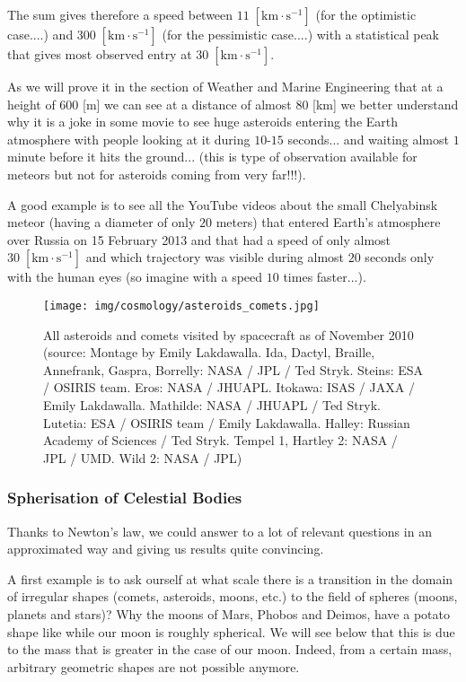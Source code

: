 	The sum gives therefore a speed between ${11 \;[\text{km}\cdot \text{s}^{-1}]}$ (for the optimistic case....) and ${300  \;[\text{km}\cdot \text{s}^{-1}]}$ (for the pessimistic case....) with a statistical peak that gives most observed entry at ${30 \;[\text{km}\cdot \text{s}^{-1}]}$.

	As we  will prove it in the section of Weather and Marine Engineering that at a height of $600$ [m] we can see at a distance of almost $80$ [km] we better understand why it is a joke in some movie to see huge asteroids entering the Earth atmosphere with people looking at it during $10$-$15$ seconds... and waiting almost $1$ minute before it hits the ground... (this is type of observation available for meteors but not for asteroids coming from very far!!!).

	A good example is to see all the YouTube videos about the small Chelyabinsk meteor (having a diameter of only $20$ meters) that entered Earth's atmosphere over Russia on 15 February 2013 and that had a speed of only almost  $30 \;[\text{km}\cdot \text{s}^{-1}]$ and which trajectory was visible during almost $20$ seconds only with the human eyes (so imagine with a speed $10$ times faster...).
	\begin{figure}[H]
		\centering
		\texttt{[image: img/cosmology/asteroids\_comets.jpg]}	
		\caption[All asteroids and comets visited by spacecraft as of November 2010]{All asteroids and comets visited by spacecraft as of November 2010 (source: Montage by Emily Lakdawalla. Ida, Dactyl, Braille, Annefrank, Gaspra, Borrelly: NASA / JPL / Ted Stryk. Steins: ESA / OSIRIS team. Eros: NASA / JHUAPL. Itokawa: ISAS / JAXA / Emily Lakdawalla. Mathilde: NASA / JHUAPL / Ted Stryk. Lutetia: ESA / OSIRIS team / Emily Lakdawalla. Halley: Russian Academy of Sciences / Ted Stryk. Tempel 1, Hartley 2: NASA / JPL / UMD. Wild 2: NASA / JPL)}
	\end{figure}
	
	\subsubsection{Spherisation of Celestial Bodies}
	Thanks to Newton's law, we could answer to a lot of relevant questions in an approximated way and giving us results quite convincing.

	A first example is to ask ourself at what scale there is a transition in the domain of irregular shapes (comets, asteroids, moons, etc.) to the field of spheres (moons, planets and stars)? Why the moons of Mars, Phobos and Deimos, have a potato shape like while our moon is roughly spherical. We will see below that this is due to the mass that is greater in the case of our moon. Indeed, from a certain mass, arbitrary geometric shapes are not possible anymore.


